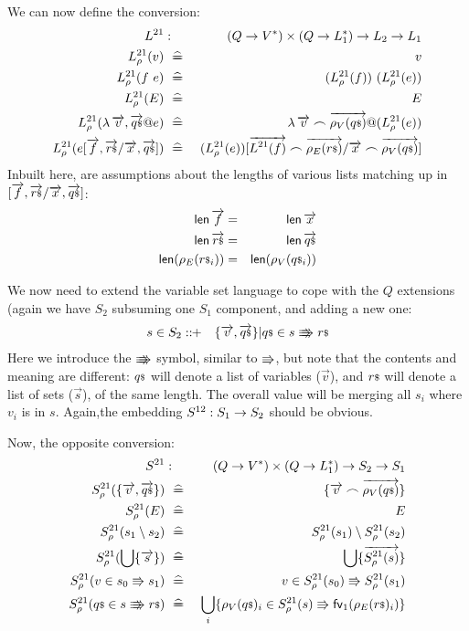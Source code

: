 We can now define the conversion:
\begin{eqnarray*}
   L^{21} &:& (Q \fun V^*) \times(Q \fun L_1^*) \fun  L_2 \fun L_1
\\ L^{21}_\rho(v) &\defs& v
\\ L^{21}_\rho(f~e) &\defs& (L^{21}_\rho(f))~(L^{21}_\rho(e))
\\ L^{21}_\rho(E) &\defs& E
\\ L^{21}_\rho(\lambda \vec v,\lstvec q @ e)
   &\defs&
   \lambda \vec v\cat\vec{\rho_V(\lst q)} @ (L^{21}_\rho(e))
\\ L^{21}_\rho(e[\vec f,\lstvec r/\vec x,\lstvec q])
   &\defs&
   (L^{21}_\rho(e))
     [ \vec{L^{21}(f)}\cat\vec{\rho_E(\lst r)}
       /
       \vec x \cat \vec{\rho_V(\lst q)}
     ]
\end{eqnarray*}
Inbuilt here, are assumptions about the lengths of various lists matching
up in $[\overrightarrow{f},\overrightarrow{{r}{\scriptstyle\$}}/\overrightarrow{x},\overrightarrow{{q}{\scriptstyle\$}}]$:
\begin{eqnarray*}
   \mathop{\mathsf{len}}\overrightarrow{f} &=& \mathop{\mathsf{len}}\overrightarrow{x}
\\ \mathop{\mathsf{len}}\overrightarrow{{r}{\scriptstyle\$}} &=& \mathop{\mathsf{len}}\overrightarrow{{q}{\scriptstyle\$}}
\\ \mathop{\mathsf{len}}(\rho_E({r}{\scriptstyle\$}_i)) &=& \mathop{\mathsf{len}}(\rho_V({q}{\scriptstyle\$}_i))
\end{eqnarray*}

We now need to extend the variable set language to cope with the $Q$ extensions
(again we have $S_2$ subsuming one $S_1$ component, and adding a new one:
\begin{eqnarray*}
   s \in S_2 &::\!\!+& \{\overrightarrow{v},\overrightarrow{{q}{\scriptstyle\$}}\} | {q}{\scriptstyle\$} \in s \Rrightarrow\mkern-14mu\Rrightarrow {r}{\scriptstyle\$}
\end{eqnarray*}
Here we introduce the $\Rrightarrow\mkern-14mu\Rrightarrow$ symbol,
similar to $\Rrightarrow$,
but note that the contents
and meaning are different: ${q}{\scriptstyle\$}$ will denote a list of variables ($\vec v$),
and ${r}{\scriptstyle\$}$ will denote a list of sets ($\vec s$), of the same length.
The overall value will be merging all $s_i$ where $v_i$ is in $s$.
Again,the embedding $S^{12} : S_1 \rightarrow S_2$ should be obvious.

Now, the opposite conversion:
\begin{eqnarray*}
   S^{21} &:& (Q \fun V^*) \times(Q \fun L_1^*) \fun S_2 \fun S_1
\\ S^{21}_\rho(\setof{\vec v,\lstvec q}) &\defs& \setof{\vec v\cat\vec{\rho_V(\lst q)}}
\\ S^{21}_\rho(E) &\defs& E
\\ S^{21}_\rho(s_1 \setminus s_2) &\defs& S^{21}_\rho(s_1) \setminus S^{21}_\rho(s_2)
\\ S^{21}_\rho(\bigcup\setof{\vec s}) &\defs&  \bigcup\setof{\vec{S^{21}_\rho(s)}}
\\ S^{21}_\rho(v \in s_0 \sthen s_1)
   &\defs&
   v \in S^{21}_\rho(s_0) \sthen S^{21}_\rho(s_1)
\\ S^{21}_\rho(\lst q \in s \ssthen \lst r)
    &\defs&
    \bigcup_i
    \setof{  \rho_V(\lst q)_i \in S^{21}_\rho(s) \sthen \fv_1(\rho_E(\lst r)_i) }
\end{eqnarray*}

